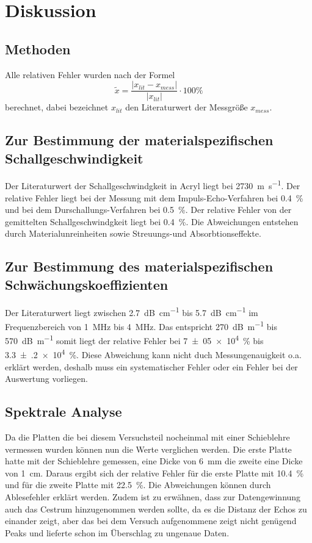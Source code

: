 \section{Diskussion}
\label{sec:Diskussion}
\subsection{Methoden}
Alle relativen Fehler wurden nach der Formel
\begin{equation*}
  \tilde{x} = \frac{ \lvert x_{lit} - x_{mess} \rvert}{\lvert x_{lit} \rvert}
  \cdot 100 \%
\end{equation*}
berechnet, dabei bezeichnet $x_{lit}$ den Literaturwert der Messgröße $x_{mess}$.
\subsection{Zur Bestimmung der materialspezifischen Schallgeschwindigkeit}
Der Literaturwert der Schallgeschwindgkeit in Acryl \cite{oly} liegt bei
\SI{2730}{\meter \per \second}. Der relative Fehler liegt bei der Messung mit
dem Impuls-Echo-Verfahren bei \SI{0.4}{\percent} und bei dem Durschallungs-Verfahren
bei \SI{0.5}{\percent}. Der relative Fehler von der gemittelten Schallgeschwindgkeit
liegt bei \SI{0.4}{\percent}. Die Abweichungen entstehen durch Materialunreinheiten
sowie Streuungs-und Absorbtionseffekte.
\subsection{Zur Bestimmung des materialspezifischen Schwächungskoeffizienten}
Der Literaturwert liegt zwischen
\SI{2.7}{\dB\per\centi\meter} bis \SI{5.7}{\dB\per\centi\meter} \cite{gampt} im Frequenzbereich
von \SI{1}{\mega\hertz} bis \SI{4}{\mega\hertz}. Das entspricht
\SI{270}{\dB\per\meter} bis \SI{570}{\dB\per\meter} somit liegt der relative
Fehler bei \SI{7(05)e4}{\percent} bis \SI{3.3(2)e4}{\percent}. Diese Abweichung
kann nicht duch Messungenauigkeit o.a. erklärt werden, deshalb muss ein systematischer
Fehler oder ein Fehler bei der Auswertung vorliegen.

\subsection{Spektrale Analyse}
Da die Platten die bei diesem Versuchsteil nocheinmal mit einer Schieblehre
vermessen wurden können nun die Werte verglichen werden. Die erste Platte hatte
mit der Schieblehre gemessen, eine Dicke von \SI{6}{\milli\meter} die zweite
eine Dicke von \SI{1}{\centi\meter}. Daraus ergibt sich der relative Fehler für
die erste Platte mit \SI{10.4}{\percent} und für die zweite Platte mit
\SI{22.5}{\percent}. Die Abweichungen können durch Ablesefehler erklärt werden.
Zudem ist zu erwähnen, dass zur Datengewinnung
auch das Cestrum hinzugenommen werden sollte, da es die Distanz der Echos zu einander
zeigt, aber das bei dem Versuch aufgenommene zeigt nicht genügend Peaks und lieferte
schon im Überschlag zu ungenaue Daten.
